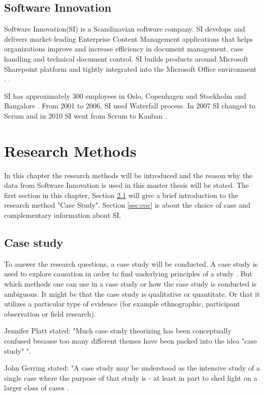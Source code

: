 \documentclass[UKenglish]{ifimaster}  %
\begin{document}
\section{Software Innovation}
\label{sec:SI}
Software Innovation(SI) is a Scandinavian software company. SI develops and delivers market-leading Enterprise Content Management applications that helps organizations improve and increase efficiency in document management, case handling and technical document control. SI builds products around Microsoft Sharepoint platform and tightly integrated into the Microsoft Office environment \parencite{Dag}. \parencite{SI}.

SI has approximately 300 employees in Oslo, Copenhagen and Stockholm and Bangalore \parencite{SI}. From 2001 to 2006, SI used Waterfall process. In 2007 SI changed to Scrum and in 2010 SI went from Scrum to Kanban \parencite{Dag}.



\chapter{Research Methods}
\label{chap:RM}
In this chapter the research methods will be introduced and the reason why the data from Software Innovation is used in this master thesis will be stated. The first section in this chapter, Section \ref{sec:CS} will give a brief introduction to the research method "Case Study".  Section \ref{sec:coc} is about the choice of case and complementary information about SI. 


\section{Case study}
\label{sec:CS}
To answer the research questions, a case study will be conducted.  A case study is used to explore causation in order to find underlying principles of a study \parencite{0078285763}\parencite{9781412960991}.  But which methods one can use in a case study or how the case study is conducted is ambiguous.  It might be that the case study is qualitative or quantitate.  Or that it utilizes a particular type of evidence (for example ethnographic, participant observation or field research). 

Jennifer Platt stated: "Much case study theorizing has been conceptually confused because too many different themes have been packed into the idea "case study" "\parencite{0521676568}.  

John Gerring stated: "A case study may be understood as the intensive study of a single case where the purpose of that study is - at least in part to shed light on a larger class of cases  \parencite{0521676568}.
\end{document}
